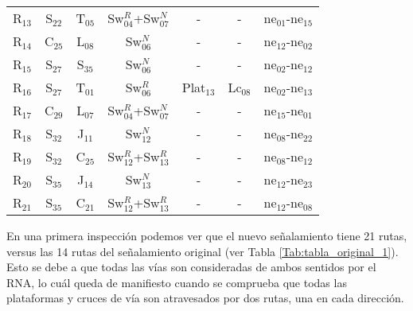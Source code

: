 \begin{table}[H]
{{\begin{tabular}{ c c c c c c c }
                    R$_{13}$  & S$_{22}$ & T$_{05}$ & Sw$_{04}^{R}$+Sw$_{07}^{N}$ & - & - & ne$_{01}$-ne$_{15}$\\
                    R$_{14}$  & C$_{25}$ & L$_{08}$ & Sw$_{06}^{N}$ & - & - & ne$_{12}$-ne$_{02}$\\
                    R$_{15}$  & S$_{27}$ & S$_{35}$ & Sw$_{06}^{N}$ & - & - & ne$_{02}$-ne$_{12}$\\
                    R$_{16}$  & S$_{27}$ & T$_{01}$ & Sw$_{06}^{R}$ & Plat$_{13}$ & Lc$_{08}$ & ne$_{02}$-ne$_{13}$\\
                    R$_{17}$  & C$_{29}$ & L$_{07}$ & Sw$_{04}^{R}$+Sw$_{07}^{N}$ & - & - & ne$_{15}$-ne$_{01}$\\
                    R$_{18}$  & S$_{32}$ & J$_{11}$ & Sw$_{12}^{N}$ & - & - & ne$_{08}$-ne$_{22}$\\
                    R$_{19}$  & S$_{32}$ & C$_{25}$ & Sw$_{12}^{R}$+Sw$_{13}^{R}$ & - & - & ne$_{08}$-ne$_{12}$\\
                    R$_{20}$  & S$_{35}$ & J$_{14}$ & Sw$_{13}^{N}$ & - & - & ne$_{12}$-ne$_{23}$\\
                    R$_{21}$  & S$_{35}$ & C$_{21}$ & Sw$_{12}^{R}$+Sw$_{13}^{R}$ & - & - & ne$_{12}$-ne$_{08}$\\
                \hline
            \end{tabular}
        }
     }
    \end{table}
    
    En una primera inspección podemos ver que el nuevo señalamiento tiene 21 rutas, versus las 14 rutas del señalamiento original (ver Tabla \ref{Tab:tabla_original_1}). Esto se debe a que todas las vías son consideradas de ambos sentidos por el RNA, lo cuál queda de manifiesto cuando se comprueba que todas las plataformas y cruces de vía son atravesados por dos rutas, una en cada dirección. 